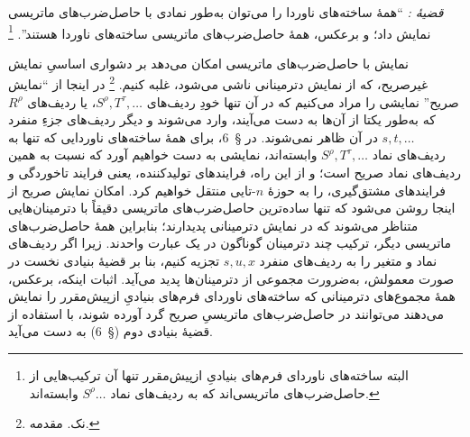\documentclass[11pt]{article}
\newcommand{\srcLTR}[1]{\relax\ifmmode\text{\mbox{\babelsublr{\foreignlanguage{english}{#1}}}}\else\babelsublr{\foreignlanguage{english}{#1}}\fi}
\begin{document}
\emph{قضیهٔ \srcLTR{I}:} ``همهٔ ساخته‌های ناوردا را می‌توان به‌طور نمادی با حاصل‌ضرب‌های ماتریسی نمایش داد؛ و برعکس، همهٔ حاصل‌ضرب‌های ماتریسی ساخته‌های ناوردا هستند''.
\footnote{البته ساخته‌های ناوردای فرم‌های بنیادیِ ازپیش‌مقرر تنها آن ترکیب‌هایی از حاصل‌ضرب‌های ماتریسی‌اند که به ردیف‌های نماد $S^\rho\ldots$ وابسته‌اند.}

نمایش با حاصل‌ضرب‌های ماتریسی امکان می‌دهد بر دشواری اساسیِ نمایش غیرصریح، که از نمایش دترمینانی ناشی می‌شود، غلبه کنیم.
\footnote{نک. مقدمه.}
در اینجا از ``نمایش صریح'' نمایشی را مراد می‌کنیم که در آن تنها خودِ ردیف‌های $S^\rho,T^\tau,\ldots$، یا ردیف‌های $R^\rho$ که به‌طور یکتا از آن‌ها به دست می‌آیند، وارد می‌شوند و دیگر ردیف‌های جزءِ منفرد $s,t,\ldots$ در آن ظاهر نمی‌شوند. در \S\ 6، برای همهٔ ساخته‌های ناوردایی که تنها به ردیف‌های نماد $S^\rho,T^\tau,\ldots$ وابسته‌اند، نمایشی به دست خواهیم آورد که نسبت به همین ردیف‌های نماد صریح است؛ و از این راه، فرایندهای تولیدکننده، یعنی فرایند تاخوردگی و فرایندهای مشتق‌گیری، را به حوزهٔ $n$-تایی منتقل خواهیم کرد. امکان نمایش صریح از اینجا روشن می‌شود که تنها ساده‌ترین حاصل‌ضرب‌های ماتریسی دقیقاً با دترمینان‌هایی متناظر می‌شوند که در نمایش دترمینانی پدیدارند؛ بنابراین همهٔ حاصل‌ضرب‌های ماتریسی دیگر، ترکیب چند دترمینان گوناگون در یک عبارت واحدند. زیرا اگر ردیف‌های نماد و متغیر را به ردیف‌های منفرد $s,u,x$ تجزیه کنیم، بنا بر قضیهٔ بنیادی نخست در صورت معمولش، به‌ضرورت مجموعی از دترمینان‌ها پدید می‌آید. اثبات اینکه، برعکس، همهٔ مجموع‌های دترمینانی که ساخته‌های ناوردای فرم‌های بنیادیِ ازپیش‌مقرر را نمایش می‌دهند می‌توانند در حاصل‌ضرب‌های ماتریسیِ صریح گرد آورده شوند، با استفاده از قضیهٔ بنیادی دوم (\S\ 6) به دست می‌آید.
\end{document}
